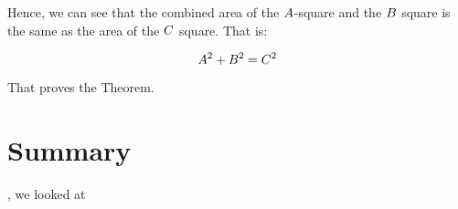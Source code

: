 \documentclass[../../../main.tex]{subfiles}
\begin{document}
Hence, we can see that the combined area of the $A$-square and the $B$ square is the same as the area of the $C$ square. That is:

\begin{equation*}
  A^{2} + B^{2} = C^{2}
\end{equation*}

That proves the Theorem.









\section{Summary}

, we looked at 
\end{document}
